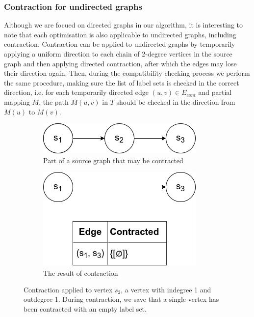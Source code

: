 \subsubsection{Contraction for undirected graphs}
Although we are focued on directed graphs in our algorithm, it is interesting to note that each optimisation is also applicable to undirected graphs, including contraction. Contraction can be applied to undirected graphs by temporarily applying a uniform direction to each chain of 2-degree vertices in the source graph and then applying directed contraction, after which the edges may lose their direction again. Then, during the compatibility checking process we perform the same procedure, making sure the list of label sets is checked in the correct direction, i.e. for each temporarily directed edge $(u, v) \in E_{cont}$ and partial mapping $M$, the path $M(u, v)$ in $T$ should be checked in the direction from $M(u)$ to $M(v)$.



\begin{figure}
\begin{subfigure}{.5\textwidth}
  \centering
\includegraphics[width=0.8\linewidth]{images/contraction/whatisit1.png}
  \caption{Part of a source graph that may be contracted}
\end{subfigure}
\begin{subfigure}{.5\textwidth}
  \centering
\includegraphics[width=0.8\linewidth]{images/contraction/whatisit2.png}
  \caption{The result of contraction}
\end{subfigure}
\caption{Contraction applied to vertex $s_2$, a vertex with indegree 1 and outdegree 1. During contraction, we save that a single vertex has been contracted with an empty label set.}
\label{fig:contraction-basic}
\end{figure}


